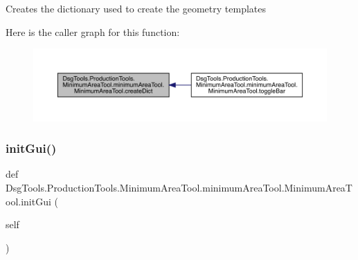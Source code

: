 \begin{DoxyVerb}Creates the dictionary used to create the geometry templates
\end{DoxyVerb}
 Here is the caller graph for this function\+:
\nopagebreak
\begin{figure}[H]
\begin{center}
\leavevmode
\includegraphics[width=350pt]{class_dsg_tools_1_1_production_tools_1_1_minimum_area_tool_1_1minimum_area_tool_1_1_minimum_area_tool_a15618d07c2bcdd70e2d9aaa3f6340eae_icgraph}
\end{center}
\end{figure}
\mbox{\label{class_dsg_tools_1_1_production_tools_1_1_minimum_area_tool_1_1minimum_area_tool_1_1_minimum_area_tool_aa2fe7d88594cf13c9740612a504c532f}} 
\subsubsection{\texorpdfstring{init\+Gui()}{initGui()}}
{\footnotesize\ttfamily def Dsg\+Tools.\+Production\+Tools.\+Minimum\+Area\+Tool.\+minimum\+Area\+Tool.\+Minimum\+Area\+Tool.\+init\+Gui (\begin{DoxyParamCaption}\item[{}]{self }\end{DoxyParamCaption})}

